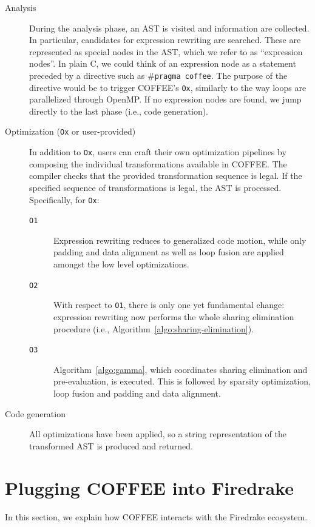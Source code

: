 \begin{description}
\item[Analysis] During the analysis phase, an AST is visited and information are collected. In particular, candidates for expression rewriting are searched. These are represented as special nodes in the AST, which we refer to as ``expression nodes''. In plain C, we could think of an expression node as a statement preceded by a directive such as \texttt{$\#$pragma coffee}. The purpose of the directive would be to trigger COFFEE's \texttt{Ox}, similarly to the way loops are parallelized through OpenMP. If no expression nodes are found, we jump directly to the last phase (i.e., code generation).

\item[Optimization ({\tt Ox} or user-provided)] In addition to \texttt{Ox}, users can craft their own optimization pipelines by composing the individual transformations available in COFFEE. The compiler checks that the provided transformation sequence is legal. If the specified sequence of transformations is legal, the AST is processed. Specifically, for {\tt Ox}:
\begin{description}
\item[\texttt{O1}] Expression rewriting reduces to generalized code motion, while only padding and data alignment as well as loop fusion are applied amongst the low level optimizations.
\item[\texttt{O2}] With respect to \texttt{O1}, there is only one yet fundamental change: expression rewriting now performs the whole sharing elimination procedure (i.e., Algorithm~\ref{algo:sharing-elimination}).
\item[\texttt{O3}] Algorithm~\ref{algo:gamma}, which coordinates sharing elimination and pre-evaluation, is executed. This is followed by sparsity optimization, loop fusion and padding and data alignment.
\end{description}

\item[Code generation]
All optimizations have been applied, so a string representation of the transformed AST is produced and returned.
\end{description}

\section{Plugging COFFEE into Firedrake}
\label{sec:coffee-implementation}

In this section, we explain how COFFEE interacts with the Firedrake ecosystem.

